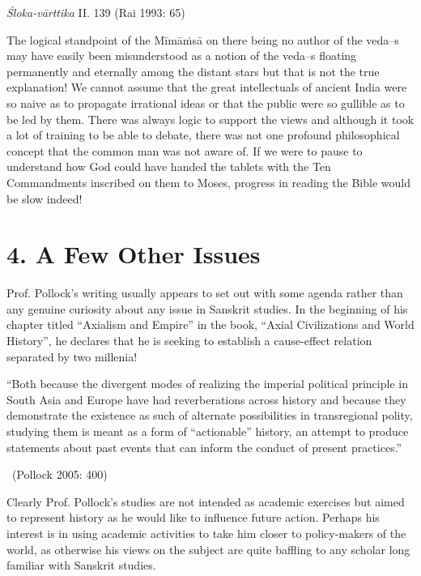  \vspace{-0.5cm} 
 \begin{flushright}
  \textit{Śloka-vārttika} II. 139 (Rai 1993: 65)
  \end{flushright}


The logical standpoint of the Mīmāṁsā on there being no author of the veda--s may have easily been misunderstood as a notion of the veda--s floating permanently and eternally among the distant stars but that is not the true explanation! We cannot assume that the great intellectuals of ancient India were so naive as to propagate irrational ideas or that the public were so gullible as to be led by them. There was always logic to support the views and although it took a lot of training to be able to debate, there was not one profound philosophical concept that the common man was not aware of. If we were to pause to understand how God could have handed the tablets with the Ten Commandments inscribed on them to Moses, progress in reading the Bible would be slow indeed!


\newpage

\section*{4. A Few Other Issues}

Prof. Pollock’s writing usually appears to set out with some agenda rather than any genuine curiosity about any issue in Sanskrit studies. In the beginning of his chapter titled “Axialism and Empire” in the book, “Axial Civilizations and World History”, he declares that he is seeking to establish a cause-effect relation separated by two millenia!

\begin{myquote}
“Both because the divergent modes of realizing the imperial political principle in South Asia and Europe have had reverberations across history and because they demonstrate the existence as such of alternate possibilities in transregional polity, studying them is meant as a form of “actionable” history, an attempt to produce statements about past events that can inform the conduct of present practices.” 

~\hfill (Pollock 2005: 400)
\end{myquote}

Clearly Prof. Pollock’s studies are not intended as academic exercises but aimed to represent history as he would like to influence future action. Perhaps his interest is in using academic activities to take him closer to policy-makers of the world, as otherwise his views on the subject are quite baffling to any scholar long familiar with Sanskrit studies.

